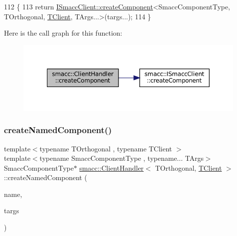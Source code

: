 \begin{DoxyCode}
112     \{
113         \textcolor{keywordflow}{return} \hyperlink{classsmacc_1_1ISmaccClient_a5c1c8eb5e91a3b399662a52cb0ca86aa}{ISmaccClient::createComponent}<SmaccComponentType, TOrthogonal, 
      \hyperlink{classTClient}{TClient}, TArgs...>(targs...);
114     \}
\end{DoxyCode}
Here is the call graph for this function\+:
\nopagebreak
\begin{figure}[H]
\begin{center}
\leavevmode
\includegraphics[width=350pt]{classsmacc_1_1ClientHandler_a4a9adad4c37104586c9b595d9030bb3c_cgraph}
\end{center}
\end{figure}
\mbox{\label{classsmacc_1_1ClientHandler_a33f440a8e06038df0dd291d2ea278f39}} 
\subsubsection{\texorpdfstring{create\+Named\+Component()}{createNamedComponent()}}
{\footnotesize\ttfamily template$<$typename T\+Orthogonal , typename T\+Client $>$ \\
template$<$typename Smacc\+Component\+Type , typename... T\+Args$>$ \\
Smacc\+Component\+Type$\ast$ \hyperlink{classsmacc_1_1ClientHandler}{smacc\+::\+Client\+Handler}$<$ T\+Orthogonal, \hyperlink{classTClient}{T\+Client} $>$\+::create\+Named\+Component (\begin{DoxyParamCaption}\item[{std\+::string}]{name,  }\item[{T\+Args...}]{targs }\end{DoxyParamCaption})\hspace{0.3cm}{\ttfamily [inline]}}



